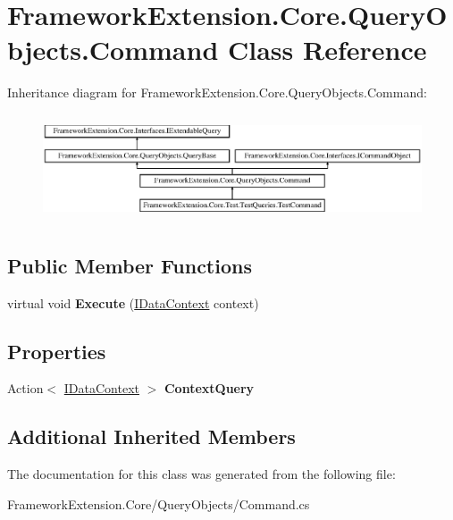 \hypertarget{class_framework_extension_1_1_core_1_1_query_objects_1_1_command}{\section{Framework\-Extension.\-Core.\-Query\-Objects.\-Command Class Reference}
\label{class_framework_extension_1_1_core_1_1_query_objects_1_1_command}
}
Inheritance diagram for Framework\-Extension.\-Core.\-Query\-Objects.\-Command\-:\begin{figure}[H]
\begin{center}
\leavevmode
\includegraphics[height=3.200000cm]{class_framework_extension_1_1_core_1_1_query_objects_1_1_command}
\end{center}
\end{figure}
\subsection*{Public Member Functions}
\begin{DoxyCompactItemize}
\item 
\hypertarget{class_framework_extension_1_1_core_1_1_query_objects_1_1_command_afb073bf6749a01552e342163d785d90a}{virtual void {\bfseries Execute} (\hyperlink{interface_framework_extension_1_1_core_1_1_interfaces_1_1_i_data_context}{I\-Data\-Context} context)}\label{class_framework_extension_1_1_core_1_1_query_objects_1_1_command_afb073bf6749a01552e342163d785d90a}

\end{DoxyCompactItemize}
\subsection*{Properties}
\begin{DoxyCompactItemize}
\item 
\hypertarget{class_framework_extension_1_1_core_1_1_query_objects_1_1_command_a65fba609b6fb3a4122f2d79b0188c33a}{Action$<$ \hyperlink{interface_framework_extension_1_1_core_1_1_interfaces_1_1_i_data_context}{I\-Data\-Context} $>$ {\bfseries Context\-Query}}\label{class_framework_extension_1_1_core_1_1_query_objects_1_1_command_a65fba609b6fb3a4122f2d79b0188c33a}

\end{DoxyCompactItemize}
\subsection*{Additional Inherited Members}


The documentation for this class was generated from the following file\-:\begin{DoxyCompactItemize}
\item 
Framework\-Extension.\-Core/\-Query\-Objects/Command.\-cs\end{DoxyCompactItemize}
